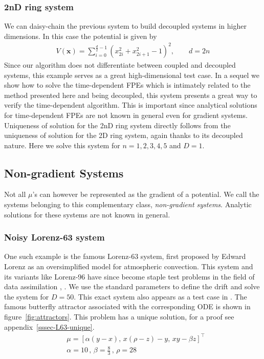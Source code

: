 \subsubsection{2nD ring system} We can daisy-chain the previous system to build decoupled systems in higher dimensions. In this case the potential is given by
\begin{align}
    V(\mathbf x)=\sum_{i=0}^{\frac{d}{2}-1}(x_{2i}^2+x_{2i+1}^2-1)^2,\qquad d=2n
\end{align}
Since our algorithm does not differentiate between coupled and decoupled systems, this example serves as a great high-dimensional test case. In a sequel we show how to solve the time-dependent FPEs which is intimately related to the method presented here and being decoupled, this system presents a great way to verify the time-dependent algorithm. This is important since analytical solutions for time-dependent FPEs are not known in general even for gradient systems. Uniqueness of solution for the 2nD ring system directly follows from the uniqueness of solution for the 2D ring system, again thanks to its decoupled nature. Here we solve this system for $n=1,2,3,4,5$ and $D=1$.
\subsection{Non-gradient Systems}
Not all $\mu$'s can however be represented as the gradient of a potential. We call the systems belonging to this complementary class, \textit{non-gradient systems}. Analytic solutions for these systems are not known in general.
\subsubsection{Noisy Lorenz-63 system}
One such example is the famous Lorenz-63 system, first proposed by Edward Lorenz \cite{lorenz1963deterministic} as an oversimplified model for atmospheric convection. This system and its variants like Lorenz-96 have since become staple test problems in the field of data assimilation \cite{carrassi2022data}, \cite{yeong2020particle}. We use the standard parameters to define the drift and solve the system for $D=50$. This exact system also appears as a test case in \cite{chen2018efficient}. The famous butterfly attractor associated with the corresponding ODE is shown in figure~\ref{fig:attractors}. This problem has a unique solution, for a proof see appendix~\ref{sssec-L63-unique}.
\begin{align}
    &\mu=[\alpha (y-x),\, x(\rho-z) - y,\, xy - \beta z]^\top\label{eq:mu-L63}\\
    &\alpha = 10 \,, \, \beta = \frac{8}{3}\,, \, \rho=28 \
\end{align}

